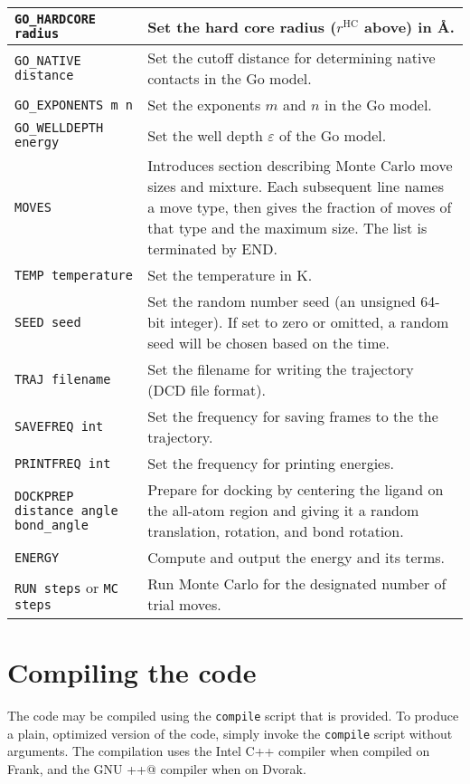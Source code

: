 \documentclass{article}      %
\begin{document}
\begin{longtable}{|l|p{3.25in}|}
\hline
\verb+GO_HARDCORE radius+ & Set the hard core radius ($r^\mathrm{HC}$ above) in \AA. \\
\hline
\verb+GO_NATIVE distance+ & Set the cutoff distance for determining native contacts in the Go model. \\
\hline
\verb+GO_EXPONENTS m n+ & Set the exponents $m$ and $n$ in the Go model. \\
\hline
\verb+GO_WELLDEPTH energy+ & Set the well depth $\varepsilon$ of the Go model. \\
\hline
\verb+MOVES+ & Introduces section describing Monte Carlo move sizes and mixture.  Each subsequent line names a move type, then gives the fraction of moves of that type and the maximum size.  The list is terminated by END. \\
\hline
\verb+TEMP temperature+& Set the temperature in K. \\
\hline
\verb+SEED seed+ & Set the random number seed (an unsigned 64-bit integer).  If set to zero or omitted, a random seed will be chosen based on the time. \\
\hline
\verb+TRAJ filename+ & Set the filename for writing the trajectory (DCD file format). \\
\hline
\verb+SAVEFREQ int+ & Set the frequency for saving frames to the the trajectory. \\
\hline
\verb+PRINTFREQ int+ & Set the frequency for printing energies. \\
\hline
\verb+DOCKPREP distance angle bond_angle+& Prepare for docking by centering the ligand on the all-atom region and giving it a random translation, rotation, and bond rotation. \\
\hline
\verb+ENERGY+ & Compute and output the energy and its terms. \\
\hline
\verb+RUN steps+ or \verb+MC steps+ & Run Monte Carlo for the designated number of trial moves. \\
\hline
\end{longtable}

\section{Compiling the code}

The code may be compiled using the \verb+compile+ script that is provided.  To produce a plain, optimized version of the code, simply invoke the \verb+compile+ script without arguments.  The compilation uses the Intel C++ compiler when compiled on Frank, and the GNU  \verb@g++@ compiler when on Dvorak.
\end{document}
